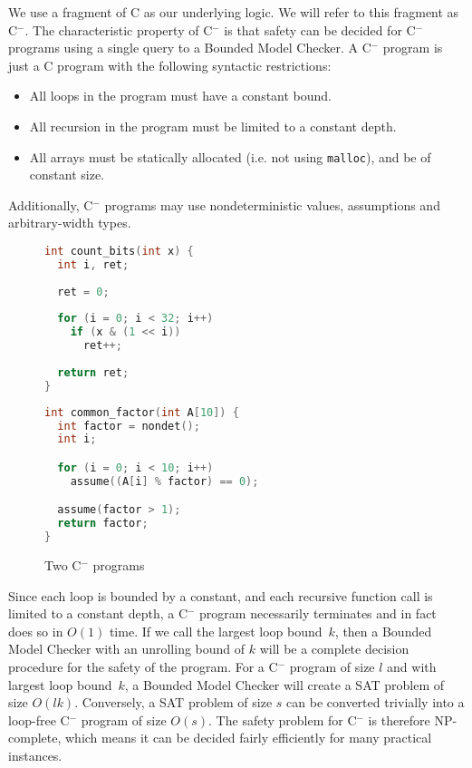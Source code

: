 \documentclass[a4paper]{llncs}
\newcommand{\newC}{C$^-$\xspace}
\begin{document}
We use a fragment of C as our underlying logic.  We will refer to this fragment
as \newC.  The characteristic property of \newC is that safety can be decided for
\newC programs using a single query to a Bounded Model Checker.  A \newC program is
just a C program with the following syntactic restrictions:

\begin{itemize}
 \item All loops in the program must have a constant bound.
 \item All recursion in the program must be limited to a constant depth.
 \item All arrays must be statically allocated (i.e. not using \texttt{malloc}),
 and be of constant size.
\end{itemize}

Additionally, \newC programs may use nondeterministic values, assumptions
and arbitrary-width types.

\begin{figure}
\begin{minipage}[scale=0.8]{0.45\linewidth}
 \begin{lstlisting}[language=c]
int count_bits(int x) {
  int i, ret;
  
  ret = 0;
  
  for (i = 0; i < 32; i++)
    if (x & (1 << i))
      ret++;
  
  return ret;
}
 \end{lstlisting}
\end{minipage}
\begin{minipage}{0.54\linewidth}
 \begin{lstlisting}[language=C]
int common_factor(int A[10]) {
  int factor = nondet();
  int i;

  for (i = 0; i < 10; i++)
    assume((A[i] % factor) == 0);

  assume(factor > 1);
  return factor;
}

 \end{lstlisting}
\end{minipage}

 \caption{Two \newC programs}
 \label{fig:c-}

\end{figure}

Since each loop is bounded by a constant, and each recursive function call is
limited to a constant depth, a \newC program necessarily terminates and in
fact does so in $O(1)$ time.  If we call the largest loop bound~$k$, then
a Bounded Model Checker with an unrolling bound of $k$ will be a complete
decision procedure for the safety of the program.  For a \newC program of
size $l$ and with largest loop bound~$k$, a Bounded Model Checker will
create a SAT problem of size $O(lk)$.  Conversely, a SAT problem
of size $s$ can be converted trivially into a loop-free \newC program
of size $O(s)$.  The safety problem for \newC is therefore NP-complete,
which means it can be decided fairly efficiently for many practical
instances.
\end{document}
